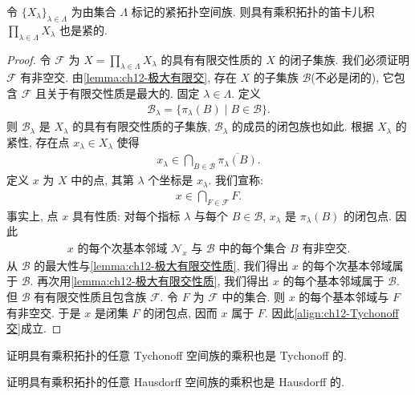 \documentclass[../../main.tex]{subfiles}
\begin{document}
\begin{theorem}\label{theorem:ch12-Tychonoff}
令 $\{X_{\lambda}\}_{\lambda\in\Lambda}$ 为由集合 $\Lambda$ 标记的紧拓扑空间族. 则具有乘积拓扑的笛卡儿积 $\prod_{\lambda\in\Lambda}X_{\lambda}$ 也是紧的.
\end{theorem}

\begin{proof}
令 $\mathcal{F}$ 为 $X=\prod_{\lambda\in\Lambda}X_{\lambda}$ 的具有有限交性质的 $X$ 的闭子集族. 我们必须证明 $\mathcal{F}$ 有非空交. 由\cref{lemma:ch12-极大有限交}, 存在 $X$ 的子集族 $\mathcal{B}$(不必是闭的), 它包含 $\mathcal{F}$ 且关于有限交性质是最大的. 固定 $\lambda\in\Lambda$. 定义
\begin{align*}
\mathcal{B}_{\lambda}=\{\pi_{\lambda}(B)\mid B\in\mathcal{B}\}.
\end{align*}
则 $\mathcal{B}_{\lambda}$ 是 $X_{\lambda}$ 的具有有限交性质的子集族, $\mathcal{B}_{\lambda}$ 的成员的闭包族也如此. 根据 $X_{\lambda}$ 的紧性, 存在点 $x_{\lambda}\in X_{\lambda}$ 使得
\begin{align*}
x_{\lambda}\in\bigcap_{B\in\mathcal{B}}\overline{\pi_{\lambda}(B)}.
\end{align*}
定义 $x$ 为 $X$ 中的点, 其第 $\lambda$ 个坐标是 $x_{\lambda}$. 我们宣称:
\begin{align}
x\in\bigcap_{F\in\mathcal{F}}F.\label{align:ch12-Tychonoff交}
\end{align}
事实上, 点 $x$ 具有性质: 对每个指标 $\lambda$ 与每个 $B\in\mathcal{B}$, $x_{\lambda}$ 是 $\pi_{\lambda}(B)$ 的闭包点. 因此
\begin{align}
x\text{ 的每个次基本邻域 }\mathcal{N}_{x}\text{ 与 }\mathcal{B}\text{ 中的每个集合 }B\text{ 有非空交}.\label{align:ch12-次基本邻域}
\end{align}
从 $\mathcal{B}$ 的最大性与\cref{lemma:ch12-极大有限交性质}, 我们得出 $x$ 的每个次基本邻域属于 $\mathcal{B}$. 再次用\cref{lemma:ch12-极大有限交性质}, 我们得出 $x$ 的每个基本邻域属于 $\mathcal{B}$. 但 $\mathcal{B}$ 有有限交性质且包含族 $\mathcal{F}$. 令 $F$ 为 $\mathcal{F}$ 中的集合. 则 $x$ 的每个基本邻域与 $F$ 有非空交. 于是 $x$ 是闭集 $F$ 的闭包点, 因而 $x$ 属于 $F$. 因此\eqref{align:ch12-Tychonoff交}成立.
\end{proof}

\begin{exercise}\label{exercise:ch12-11}
证明具有乘积拓扑的任意 Tychonoff 空间族的乘积也是 Tychonoff 的.
\end{exercise}

\begin{exercise}\label{exercise:ch12-12}
证明具有乘积拓扑的任意 Hausdorff 空间族的乘积也是 Hausdorff 的.
\end{exercise}
\end{document}
